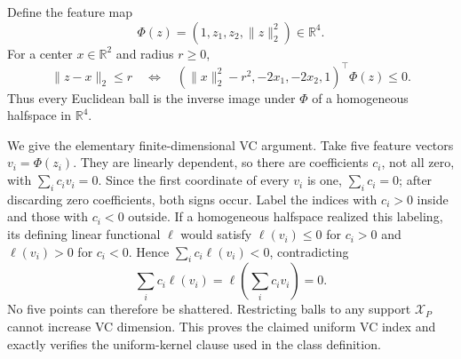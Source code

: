 Define the feature map
\[
 \Phi(z)=(1,z_1,z_2,\lVert z\rVert_2^2)\in\mathbb R^4.
\]
For a center \(x\in\mathbb R^2\) and radius \(r\geq0\),
\[
 \lVert z-x\rVert_2\leq r
 \quad\Longleftrightarrow\quad
 (\lVert x\rVert_2^2-r^2,-2x_1,-2x_2,1)^\top\Phi(z)\leq0.
\]
Thus every Euclidean ball is the inverse image under \(\Phi\) of a homogeneous halfspace in \(\mathbb R^4\).

We give the elementary finite-dimensional VC argument.  Take five feature vectors \(v_i=\Phi(z_i)\).  They are linearly dependent, so there are coefficients \(c_i\), not all zero, with \(\sum_i c_i v_i=0\).  Since the first coordinate of every \(v_i\) is one, \(\sum_i c_i=0\); after discarding zero coefficients, both signs occur.  Label the indices with \(c_i>0\) inside and those with \(c_i<0\) outside.  If a homogeneous halfspace realized this labeling, its defining linear functional \(\ell\) would satisfy \(\ell(v_i)\leq0\) for \(c_i>0\) and \(\ell(v_i)>0\) for \(c_i<0\).  Hence \(\sum_i c_i\ell(v_i)<0\), contradicting
\[
 \sum_i c_i\ell(v_i)=\ell\!\left(\sum_i c_i v_i\right)=0.
\]
No five points can therefore be shattered.  Restricting balls to any support \(\mathcal X_P\) cannot increase VC dimension.  This proves the claimed uniform VC index and exactly verifies the uniform-kernel clause used in the class definition.
